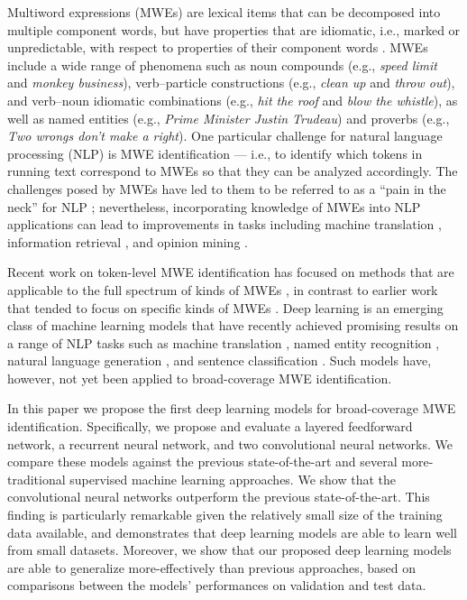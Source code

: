 \documentclass[11pt,a4paper]{article}
\begin{document}
Multiword expressions (MWEs) are lexical items that can be decomposed
into multiple component words, but have properties that are idiomatic,
i.e., marked or unpredictable, with respect to properties of their
component words \cite{Baldwin:Kim:2010}. MWEs include a wide range of
phenomena such as noun compounds (e.g., \textit{speed limit} and
\textit{monkey business}), verb--particle constructions (e.g.,
\emph{clean up} and \emph{throw out}), and verb--noun idiomatic
combinations (e.g., \textit{hit the roof} and \textit{blow the
  whistle}), as well as named entities (e.g., \textit{Prime Minister
  Justin Trudeau}) and proverbs (e.g., \textit{Two wrongs don't make a
  right}). One particular challenge for natural language processing
(NLP) is MWE identification --- i.e., to identify which tokens in
running text correspond to MWEs so that they can be analyzed
accordingly. The challenges posed by MWEs have led to them to be
referred to as a ``pain in the neck'' for NLP \cite{sag2002multiword};
nevertheless, incorporating knowledge of MWEs into NLP applications
can lead to improvements in tasks including machine translation
\cite{carpuat2010task}, information retrieval
\cite{newman2012bayesian}, and opinion mining
\cite{berend2011opinion}.

Recent work on token-level MWE identification has focused on methods
that are applicable to the full spectrum of kinds of MWEs
\cite{schneider2014discriminative}, in contrast to earlier work that
tended to focus on specific kinds of MWEs
\cite{Uchiyama2005,Fazly2009,Fothergill:Baldwin:2012}. Deep learning
is an emerging class of machine learning models that have recently
achieved promising results on a range of NLP tasks such as machine
translation \cite{bahdanau2014neural,sutskever2014sequence}, named entity recognition \cite{DBLP:conf/naacl/LampleBSKD16}, natural
language generation \cite{DBLP:conf/acl/LiLJ15}, and sentence
classification \cite{DBLP:conf/emnlp/Kim14}. Such models have,
however, not yet been applied to broad-coverage MWE identification.

In this paper we propose the first deep learning models for
broad-coverage MWE identification. Specifically, we propose and
evaluate a layered feedforward network, a recurrent neural network,
and two convolutional neural networks. We compare these models against
the previous state-of-the-art \cite{DBLP:conf/semeval/KirilinKV16} and
several more-traditional supervised machine learning approaches. We
show that the convolutional neural networks outperform the previous
state-of-the-art. This finding is particularly remarkable given the
relatively small size of the training data available, and demonstrates
that deep learning models are able to learn well from small
datasets. Moreover, we show that our proposed deep learning models are
able to generalize more-effectively than previous approaches, based on
comparisons between the models' performances on validation and test
data.
\end{document}
